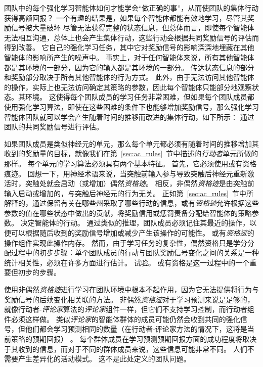 团队中的每个强化学习智能体如何才能学会“做正确的事”，从而使团队的集体行动获得高额回报？
一个有趣的结果是，如果每个智能体都能有效地学习，尽管其奖励信号被大量破坏 尽管无法获得完整的状态信息，但总体而言，即使每个智能体无法相互沟通，总体上也会产生集体行动，这些行动会根据共同奖励信号的评估而得到改善。
它自己的强化学习任务，其中它对奖励信号的影响深深地埋藏在其他智能体的影响所产生的噪声中。
事实上，对于任何智能体来说，所有其他智能体都是其环境的一部分，因为它的输入都是其环境的一部分。
传达状态信息的部分和奖励部分取决于所有其他智能体的行为方式。
此外，由于无法访问其他智能体的操作，实际上也无法访问确定其策略的参数，因此每个智能体只能部分地观察状态。其环境。
这使得每个团队成员的学习任务非常困难，但如果每个团队成员都使用强化学习算法，即使在这些困难的条件下也能够增加奖励信号，那么强化学习智能体团队就可以学会产生随着时间的推移而改进的集体行动，如下所示： 通过团队的共同奖励信号进行评估。


如果团队成员是类似神经元的单元，那么每个单元都必须有随着时间的推移增加其收到的奖励量的目标，就像我们在第~\ref{sec:ac_rules}~节中描述的\textit{行动者}单元所做的那样。
每个单元的学习算法必须具有两个基本特征。
首先，它必须使用或有资格痕迹。
回想一下，用神经术语来说，当突触前输入参与导致突触后神经元重新激活时，突触处就会启动（或增加）偶然\textit{资格迹}。
相反，非偶然\textit{资格迹}是由突触前输入启动或增加的，与突触后神经元的行为无关。
正如第~\ref{sec:ac_rules}~节中所解释的，通过保留有关在哪些州采取了哪些行动的信息，或有\textit{资格迹}允许根据这些参数的值在哪些状态中做出的贡献，将奖励信用或惩罚责备分配给智能体的策略参数。
决定智能体的行动。
通过类似的推理，团队成员必须记住其最近的操作，以便可以根据随后收到的奖励信号增加或减少产生该操作的可能性。
或有\textit{资格迹}的操作组件实现此操作内存。
然而，由于学习任务的复杂性，偶然资格只是学分分配过程中的初步步骤：单个团队成员的行动与团队奖励信号变化之间的关系是一种统计相关性，必须在许多方面进行估计。
试验。
或有资格是这一过程中的一个重要但初步的步骤。


使用非偶然\textit{资格迹}进行学习在团队环境中根本不起作用，因为它无法提供将行为与奖励信号的后续变化相关联的方法。
非偶然\textit{资格迹}对于学习预测来说是足够的，就像行动者-\textit{评论家}算法的\textit{评论家}组件一样，但它们不支持学习控制，而行动者组件必须这样做。
类似\textit{评论家}的智能体群体的成员可能仍然会收到共同的强化信号，但他们都会学习预测相同的数量（在行动者-评论家方法的情况下，这将是当前策略的预期回报） 。
每个群体成员在学习预测预期回报方面的成功程度将取决于其收到的信息，而对于不同的群体成员来说，这些信息可能非常不同。
人们不需要产生差异化的活动模式。
这不是此处定义的团队问题。


